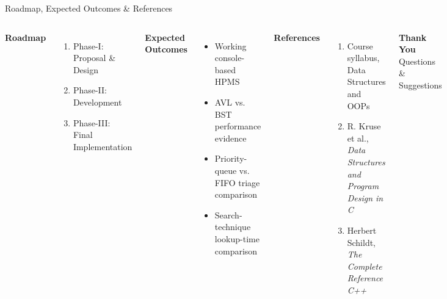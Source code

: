 \documentclass[aspectratio=169,11pt]{beamer}
\begin{document}
\begin{frame}{Roadmap, Expected Outcomes \& References}
\begin{columns}[T,totalwidth=\textwidth]
\textbf{\color{GEUBlue}Roadmap}
\begin{enumerate}\itemsep3pt
\item Phase-I: Proposal \& Design
\item Phase-II: Development
\item Phase-III: Final Implementation
\end{enumerate}
\vspace{2mm}
\textbf{\color{GEUBlue}Expected Outcomes}
\begin{itemize}\itemsep2pt
\item Working console-based HPMS
\item AVL vs. BST performance evidence
\item Priority-queue vs. FIFO triage comparison
\item Search-technique lookup-time comparison
\end{itemize}
\textbf{\color{GEUBlue}References}
\begin{enumerate}\itemsep3pt
\item Course syllabus, Data Structures and OOPs
\item R. Kruse et al., \emph{Data Structures and Program Design in C}
\item Herbert Schildt, \emph{The Complete Reference C++}
\end{enumerate}
\vfill
\begin{center}
\colorbox{GEUBlue}{\parbox{.78\textwidth}{\centering\color{white}\textbf{Thank You}\\Questions \& Suggestions}}
\end{center}
\end{columns}
\end{frame}
\end{document}
